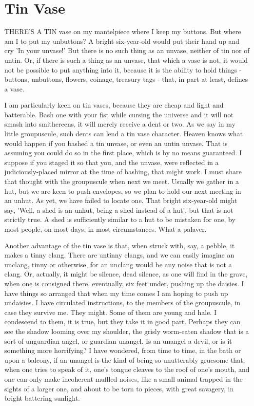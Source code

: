 \chapter{Tin Vase}

THERE'S A TIN vase on my mantelpiece where I keep my buttons. But where am I to put my unbuttons? A bright six-year-old would put their hand up and cry 'In your unvase!' But there is no such thing as an unvase, neither of tin nor of untin. Or, if there is such a thing as an unvase, that which a vase is not, it would not be possible to put anything into it, because it is the ability to hold things - buttons, unbuttons, flowers, coinage, treasury tags - that, in part at least, defines a vase.

I am particularly keen on tin vases, because they are cheap and light and batterable. Bash one with your fist while cursing the universe and it will not smash into smithereens, it will merely receive a dent or two. As we say in my little groupuscule, such dents can lend a tin vase character. Heaven knows what would happen if you bashed a tin unvase, or even an untin unvase. That is assuming you could do so in the first place, which is by no means guaranteed. I suppose if you staged it so that you, and the unvase, were reflected in a judiciously-placed mirror at the time of bashing, that might work. I must share that thought with the groupuscule when next we meet. Usually we gather in a hut, but we are keen to push envelopes, so we plan to hold our next meeting in an unhut. As yet, we have failed to locate one. That bright six-year-old might say, 'Well, a shed is an unhut, being a shed instead of a hut', but that is not strictly true. A shed is sufficiently similar to a hut to be mistaken for one, by most people, on most days, in most circumstances. What a palaver.

Another advantage of the tin vase is that, when struck with, say, a pebble, it makes a tinny clang. There are untinny clangs, and we can easily imagine an unclang, tinny or otherwise, for an unclang would be any noise that is not  a clang. Or, actually, it might be silence, dead silence, as one will find in the grave, when one is consigned there, eventually, six feet under, pushing up the daisies. I have things so arranged that when my time comes I am hoping to push up undaisies. I have circulated instructions, to the members of the groupuscule, in case they survive me. They might. Some of them are young and hale. I condescend to them, it is true, but they take it in good part. Perhaps they can see the shadow looming over my shoulder, the grisly worm-eaten shadow that is a sort of unguardian angel, or guardian unangel. Is an unangel a devil, or is it something more horrifying? I have wondered, from time to time, in the bath or upon a balcony, if an unangel is the kind of being so unutterably gruesome that, when one tries to speak of it, one's tongue cleaves to the roof of one's mouth, and one can only make incoherent muffled noises, like a small animal trapped in the sights of a larger one, and about to be torn to pieces, with great savagery, in bright battering sunlight.


